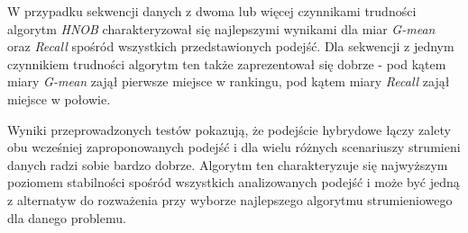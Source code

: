 W przypadku sekwencji danych z dwoma lub więcej czynnikami trudności algorytm \textit{HNOB} charakteryzował się najlepszymi wynikami dla miar \textit{G-mean} oraz \textit{Recall} spośród wszystkich przedstawionych podejść. Dla sekwencji z jednym czynnikiem trudności algorytm ten także zaprezentował się dobrze - pod kątem miary \textit{G-mean} zajął pierwsze miejsce w rankingu, pod kątem miary \textit{Recall} zajął miejsce w połowie.

Wyniki przeprowadzonych testów pokazują, że podejście hybrydowe łączy zalety obu wcześniej zaproponowanych podejść i dla wielu różnych scenariuszy strumieni danych radzi sobie bardzo dobrze. Algorytm ten charakteryzuje się najwyższym poziomem stabilności spośród wszystkich analizowanych podejść i może być jedną z alternatyw do rozważenia przy wyborze najlepszego algorytmu strumieniowego dla danego problemu.